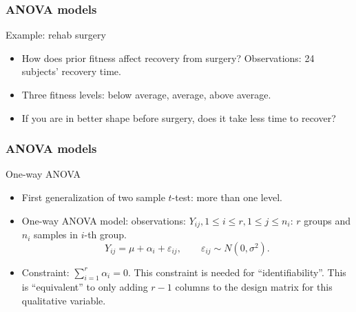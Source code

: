 \documentclass[handout]{beamer}
\begin{document}

   \begin{frame} \frametitle{ANOVA models}

   \begin{block}
   {Example: rehab surgery}

   \begin{itemize}[<+->]

   \item How does prior fitness affect recovery from surgery? Observations: 24 subjects' recovery time.

   \item Three fitness levels: below average, average, above average.

   \item If you are in better shape before surgery, does it take less time to recover?
   \end{itemize}
   \end{block}
   \end{frame}


   \begin{frame} \frametitle{ANOVA models}

   \begin{block}
   {One-way ANOVA}
   \begin{itemize}

   \item First generalization of two sample $t$-test: more than one level.
   \item One-way ANOVA model: observations: $Y_{ij}, 1 \leq i \leq r, 1 \leq j \leq n_i$: $r$ groups and $n_i$ samples in $i$-th group.
   $$
   Y_{ij} = \mu  + \alpha_i + \varepsilon_{ij}, \qquad \varepsilon_{ij} \sim N(0, \sigma^2).$$

   \item Constraint: $\sum_{i=1}^r \alpha_i = 0$. This constraint is needed for ``identifiability''. This is ``equivalent'' to only adding $r-1$ columns to the design matrix for this qualitative variable.
   \end{itemize}

   \end{block}
   \end{frame}

\end{document}
